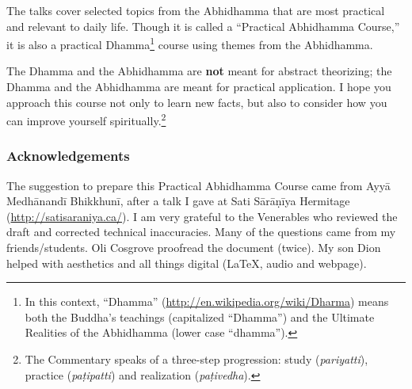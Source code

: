 The talks cover selected topics from the Abhidhamma that are most practical and relevant to daily life. Though it is called a “Practical Abhidhamma Course,” it is also a practical Dhamma\footnote{In this context, “Dhamma” (\url{http://en.wikipedia.org/wiki/Dharma}) means both the Buddha’s teachings (capitalized “Dhamma”) and the Ultimate Realities of the Abhidhamma (lower case “dhamma”).} course using themes from the Abhidhamma.

The Dhamma and the Abhidhamma are \textbf{not} meant for abstract theorizing; the Dhamma and the Abhidhamma are meant for practical application. I hope you approach this course not only to learn new facts, but also to consider how you can improve yourself spiritually.\footnote{The Commentary speaks of a three-step progression: study (\textit{pariyatti}), practice (\textit{paṭipatti}) and realization (\textit{paṭivedha}).}

\color{red}

\subsubsection*{Acknowledgements}

The suggestion to prepare this Practical Abhidhamma Course came from Ayyā Medhānandī Bhikkhunī, after a talk I gave at Sati Sārāṇīya Hermitage (\url{http://satisaraniya.ca/}). I am very grateful to the Venerables who reviewed the draft and corrected technical inaccuracies. Many of the questions came from my friends/students. Oli Cosgrove proofread the document (twice). My son Dion helped with aesthetics and all things digital (\LaTeX, audio and webpage).


\color{black}